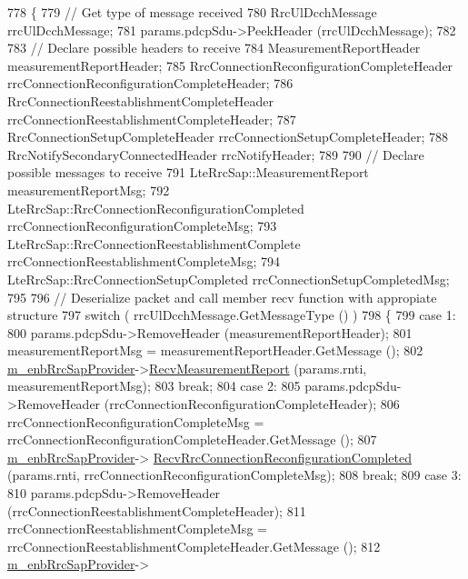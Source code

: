 \begin{DoxyCode}
778 \{
779   \textcolor{comment}{// Get type of message received}
780   RrcUlDcchMessage rrcUlDcchMessage;
781   params.pdcpSdu->PeekHeader (rrcUlDcchMessage);
782 
783   \textcolor{comment}{// Declare possible headers to receive}
784   MeasurementReportHeader measurementReportHeader;
785   RrcConnectionReconfigurationCompleteHeader rrcConnectionReconfigurationCompleteHeader;
786   RrcConnectionReestablishmentCompleteHeader rrcConnectionReestablishmentCompleteHeader;
787   RrcConnectionSetupCompleteHeader rrcConnectionSetupCompleteHeader;
788   RrcNotifySecondaryConnectedHeader rrcNotifyHeader;
789 
790   \textcolor{comment}{// Declare possible messages to receive}
791   LteRrcSap::MeasurementReport measurementReportMsg;
792   LteRrcSap::RrcConnectionReconfigurationCompleted rrcConnectionReconfigurationCompleteMsg;
793   LteRrcSap::RrcConnectionReestablishmentComplete rrcConnectionReestablishmentCompleteMsg;
794   LteRrcSap::RrcConnectionSetupCompleted rrcConnectionSetupCompletedMsg;
795 
796   \textcolor{comment}{// Deserialize packet and call member recv function with appropiate structure}
797   \textcolor{keywordflow}{switch} ( rrcUlDcchMessage.GetMessageType () )
798     \{
799     \textcolor{keywordflow}{case} 1:
800       params.pdcpSdu->RemoveHeader (measurementReportHeader);
801       measurementReportMsg = measurementReportHeader.GetMessage ();
802       \hyperlink{classns3_1_1LteEnbRrcProtocolReal_a92e8443c2bba64b254a53d95b495fb39}{m\_enbRrcSapProvider}->\hyperlink{classns3_1_1LteEnbRrcSapProvider_abf788b7395d6a2bc7e0ab86a3f992695}{RecvMeasurementReport} (params.rnti,
      measurementReportMsg);
803       \textcolor{keywordflow}{break};
804     \textcolor{keywordflow}{case} 2:
805       params.pdcpSdu->RemoveHeader (rrcConnectionReconfigurationCompleteHeader);
806       rrcConnectionReconfigurationCompleteMsg = rrcConnectionReconfigurationCompleteHeader.GetMessage ();
807       \hyperlink{classns3_1_1LteEnbRrcProtocolReal_a92e8443c2bba64b254a53d95b495fb39}{m\_enbRrcSapProvider}->
      \hyperlink{classns3_1_1LteEnbRrcSapProvider_a551d1002a06181295debe624dfd1322b}{RecvRrcConnectionReconfigurationCompleted} (params.rnti,
      rrcConnectionReconfigurationCompleteMsg);
808       \textcolor{keywordflow}{break};
809     \textcolor{keywordflow}{case} 3:
810       params.pdcpSdu->RemoveHeader (rrcConnectionReestablishmentCompleteHeader);
811       rrcConnectionReestablishmentCompleteMsg = rrcConnectionReestablishmentCompleteHeader.GetMessage ();
812       \hyperlink{classns3_1_1LteEnbRrcProtocolReal_a92e8443c2bba64b254a53d95b495fb39}{m\_enbRrcSapProvider}->

\end{DoxyCode}
